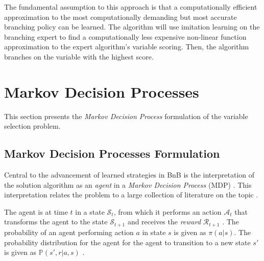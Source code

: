 The fundamental assumption to this approach is that a computationally efficient approximation to the most computationally demanding but most accurate branching policy can be learned. The algorithm will use imitation learning on the branching expert to find a computationally less expensive non-linear function approximation to the expert algorithm's variable scoring. Then, the algorithm branches on the variable with the highest score. 




\section{Markov Decision Processes}\label{sec:back_mdp}

This section presents the \textit{Markov Decision Process} formulation of the variable selection problem. 


\subsection{Markov Decision Processes Formulation}\label{ssec:mdp}

Central to the advancement of learned strategies in \gls{BnB} is the interpretation of the solution algorithm as an \textit{agent} in a \textit{Markov Decision Process} (\gls{MDP}) \cite{gasse2019exact}. This interpretation relates the problem to a large collection of literature on the topic \cite{howard1960dynamic}.

The agent is at time $t$ in a state $\mathcal{S}_t$, from which it performs an action $\mathcal{A}_t$ that transforms the agent to the state $\mathcal{S}_{t+1}$ and receives the \textit{reward} $\mathcal{R}_{t+1}$ \cite{prouvost2021ecole}. The probability of an agent performing action $a$ in state $s$ is given as $\pi (a | s)$. The probability distribution for the agent for the agent to transition to a new state $s'$ is given as $\mathbb{P}(s', r | a, s)$ \cite{prouvost2021ecole}. 

